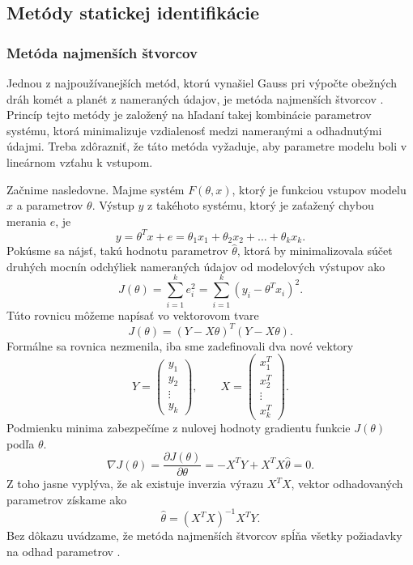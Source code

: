 \subsection{Metódy statickej identifikácie}
\subsubsection*{Metóda najmenších štvorcov}
Jednou z najpoužívanejších metód, ktorú vynašiel Gauss pri výpočte obežných dráh komét a planét z nameraných údajov, je metóda najmenších štvorcov \cite{hostetter:recursive_est:1987}. Princíp tejto metódy je založený na hľadaní takej kombinácie parametrov systému, ktorá minimalizuje vzdialenosť medzi nameranými a odhadnutými údajmi. Treba zdôrazniť, že táto metóda vyžaduje, aby parametre modelu boli v lineárnom vzťahu k vstupom.

Začnime nasledovne. Majme systém $ F(\theta, x) $, ktorý je funkciou vstupov modelu $ x $ a parametrov $ \theta $. Výstup $ y $ z takéhoto systému, ktorý je zaťažený chybou merania $ e $, je
\begin{equation}
	y = \theta^T x + e = \theta_1x_1 + \theta_2x_2 + \dots + \theta_kx_k.
\end{equation}
Pokúsme sa nájsť, takú hodnotu parametrov $ \hat{\theta} $, ktorá by minimalizovala súčet druhých mocnín odchýliek nameraných údajov od modelových výstupov ako
\begin{equation}
	J\left(\theta\right) = \sum_{i=1}^{k} e_i^2 = \sum_{i=1}^{k} \left(y_i - \theta^T x_i\right)^2.
\end{equation}
Túto rovnicu môžeme napísať vo vektorovom tvare
\begin{equation}
	J\left(\theta\right) = \left(Y - X\theta \right)^T \left(Y - X\theta \right).
\end{equation} 
Formálne sa rovnica nezmenila, iba sme zadefinovali dva nové vektory
\begin{equation}
	Y = \begin{pmatrix}
			y_1 \\
			y_2 \\
			\vdots \\
			y_k
		\end{pmatrix}, \qquad
	X = \begin{pmatrix}
			x_1^T \\
			x_2^T \\
			\vdots \\
			x_k^T
		\end{pmatrix}.
\end{equation}
Podmienku minima zabezpečíme z nulovej hodnoty gradientu funkcie $ J(\theta) $ podľa $ \theta $.
\begin{equation}
	\nabla J \left(\theta\right) = \frac{\partial J \left(\theta\right)}{\partial \theta} = -X^T Y + X^T X\hat{\theta} = 0.
\end{equation}
Z toho jasne vyplýva, že ak existuje inverzia výrazu $ X^T X $, vektor odhadovaných parametrov získame ako 
\begin{equation}
	\hat{\theta} = \left(X^T X\right)^{-1}X^T Y.
\end{equation}
Bez dôkazu uvádzame, že metóda najmenších štvorcov spĺňa všetky požiadavky na odhad parametrov \cite{fikar:identifikacia:1999}.

